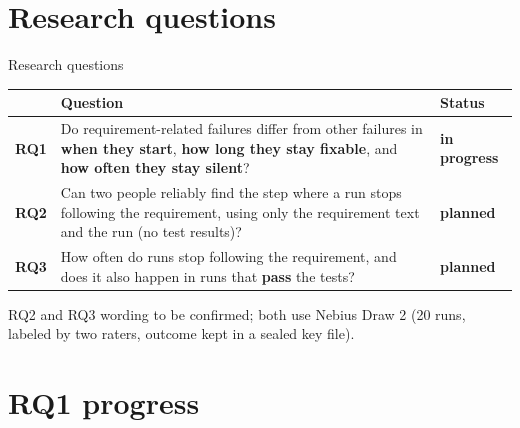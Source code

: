 \documentclass[aspectratio=169,11pt]{beamer}
\newcommand{\now}{{\small\color{accentAmber}\textbf{in progress}}}
\newcommand{\todo}{{\small\color{gray}\textbf{planned}}}
\newcommand{\fine}[1]{{\scriptsize\color{gray}#1}}
\begin{document}
\section{Research questions}

\begin{frame}{Research questions}
  \begin{tabularx}{\textwidth}{@{}lLl@{}}
    \toprule
    & \textbf{Question} & \textbf{Status} \\
    \midrule
    \textbf{RQ1} & Do requirement-related failures differ from other failures in \textbf{when they start},
      \textbf{how long they stay fixable}, and \textbf{how often they stay silent}? & \now \\[4pt]
    \textbf{RQ2} & Can two people reliably find the step where a run stops following the requirement,
      using only the requirement text and the run (no test results)? & \todo \\[4pt]
    \textbf{RQ3} & How often do runs stop following the requirement, and does it also happen in runs that
      \textbf{pass} the tests? & \todo \\
    \bottomrule
  \end{tabularx}
  \vfill
  \fine{RQ2 and RQ3 wording to be confirmed; both use Nebius Draw 2 (20 runs, labeled by two raters, outcome kept in a sealed key file).}
\end{frame}

\section{RQ1 progress}
\end{document}
